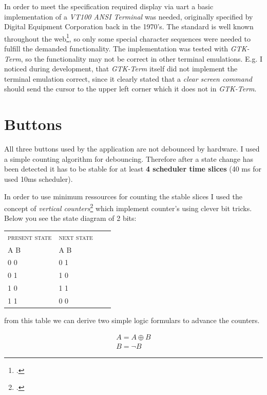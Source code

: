 \documentclass[12pt,a4paper,titlepage,oneside]{article}
\begin{document}
In order to meet the specification required display via uart a basic implementation of a { \it VT100 ANSI Terminal } was needed, originally specified by Digital Equipment Corporation back in the 1970's. The standard is well known throughout the web\footcite{VT100}, so only some special character sequences were needed to fulfill the demanded functionality. The implementation was tested with { \it GTK-Term}, so the functionality may not be correct in other terminal emulations. E.g. I noticed during development, that { \it GTK-Term } itself did  not implement the terminal emulation correct, since it clearly stated that a {\it clear screen command } should send the cursor to the upper left corner which it does not in {\it GTK-Term}.

\section{Buttons}

All three buttons used by the application are not debounced by hardware. I used a simple counting algorithm for debouncing. Therefore after a state change has been detected it has to be stable for at least {\bf 4 scheduler time slices} (40 ms for used 10ms scheduler). 

In order to use minimum ressources for counting the stable slices I used the concept of {\it vertical counters}\footcite{Debounce} which implement counter's using clever bit tricks. Below you see the state diagram of 2 bits:

\begin{tabular}{|l|l|l|c|}
\hline
\textsc{present state} & \textsc{next state} \\
\textsc{A B} & { A B } \\
\hline
0 0 & 0 1 \\
0 1 & 1 0 \\
1 0 & 1 1 \\
1 1 & 0 0 \\ 
\hline
\end{tabular}

from this table we can derive two simple logic formulars to advance the counters.

\begin{equation}
\begin{aligned}
A = A \oplus B \\
B = \neg B
\end{aligned}
\end{equation}
\end{document}
